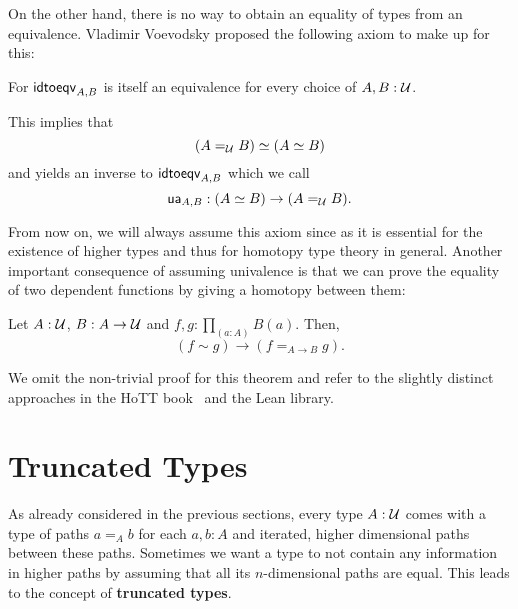 On the other hand, there is no way to obtain an equality of types from an equivalence.
Vladimir Voevodsky proposed the following axiom to make up for this:
\begin{axiom}[Univalence]
For $\mathsf{idtoeqv}_{A, B}$ is itself an equivalence for every choice of $A, B : \mathcal{U}$.

This implies that
\begin{equation*}
(A =_{\mathcal{U}} B) \simeq (A \simeq B)
\end{equation*}
and yields an inverse to $\mathsf{idtoeqv}_{A, B}$ which we call
\begin{equation*}
\mathsf{ua}_{A, B} : (A \simeq B) \to (A =_{\mathcal{U}} B) \text{.}
\end{equation*}
\end{axiom}

From now on, we will always assume this axiom since as it is essential for the existence
of higher types and thus for homotopy type theory in general.
Another important consequence of assuming univalence is that we can prove
the equality of two dependent functions by giving a homotopy between them:
\begin{thm} \label{thm:funext-hott}
Let $A : \mathcal{U}$, $B : A \to \mathcal{U}$ and $f, g : \prod_{(a : A)} B(a)$. Then,
\begin{equation*}
(f \sim g) \to (f =_{A \to B} g) \text{.}
\end{equation*}
\end{thm}
We omit the non-trivial proof for this theorem and refer to the slightly distinct
approaches in the HoTT book~\cite{hottbook} and the Lean library.

\section{Truncated Types}

As already considered in the previous sections, every type $A : \mathcal{U}$ comes with
a type of paths $a =_A b$ for each $a, b : A$ and iterated, higher dimensional
paths between these paths.
Sometimes we want a type to not contain any information in higher paths by assuming
that all its $n$-dimensional paths are equal.
This leads to the concept of \textbf{truncated types}.


